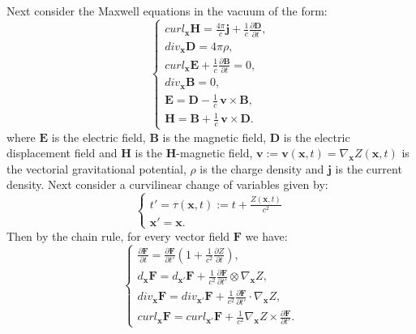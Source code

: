 \documentclass{article}
\theoremstyle{definition}
\theoremstyle{remark}
\renewcommand{\vec}[1]{\mathbf{#1}}
\newcommand{\R}{\mathbb{R}}
\newcommand{\R}{{\mathbb{R}}}
\begin{document}
Next consider the Maxwell equations in the vacuum of the form:
\begin{equation}\label{MaxMedFullGGffgguiuiouioKK}
\begin{cases}
curl_{\vec x} \vec H= \frac{4\pi}{c}\vec j+
\frac{1}{c}\frac{\partial \vec D}{\partial t},\\
div_{\vec x}\vec D= 4\pi\rho,\\
curl_{\vec x} \vec E+\frac{1}{c}\frac{\partial \vec B}{\partial t}=0,\\
div_{\vec x} \vec B=0,\\
\vec E=
\vec D-\frac{1}{c}\,\vec v\times \vec B,\\
\vec H=
\vec B+\frac{1}{c}\,\vec v\times \vec D.
\end{cases}
\end{equation}
where $\vec E$ is the electric field, $\vec B$ is the magnetic
field, $\vec D$ is the electric displacement field and $\vec H$ is
the $\vec H$-magnetic field, $\vec v:=\vec v(\vec x,t)=\nabla_{\vec
x}Z(\vec x,t)$ is the vectorial gravitational potential, $\rho$ is
the charge density and $\vec j$ is the current density. Next
consider a curvilinear change of variables given by:
\begin{equation}\label{giuuihjghgghjgj78zzrrZZffhhhggygghghjhvbKK}
\begin{cases}
t'=\tau(\vec x,t):=t+\frac{Z(\vec x,t)}{c^2}\\
\vec x'=\vec x.
\end{cases}
\end{equation}
Then by the chain rule, for every vector field $\vec F$ we have:
\begin{equation}\label{giuuihjghgghjgj78zzrrZZffhhhggygghghjhvbKKkk}
\begin{cases}
\frac{\partial \vec F}{\partial t}=\frac{\partial \vec F}{\partial
t'}\left(1+\frac{1}{c^2}\frac{\partial Z}{\partial t}\right),\\
d_{\vec x}\vec F=d_{\vec x'}\vec F+\frac{1}{c^2}\frac{\partial \vec
F}{\partial
t'}\otimes\nabla_{\vec x}Z,\\
div_{\vec x}\vec F=div_{\vec x'}\vec F+\frac{1}{c^2}\frac{\partial
\vec
F}{\partial t'}\cdot\nabla_{\vec x}Z,\\
curl_{\vec x}\vec F=curl_{\vec x'}\vec F+\frac{1}{c^2}\nabla_{\vec
x}Z\times\frac{\partial \vec F}{\partial t'}.
\end{cases}
\end{equation}
\end{document}
